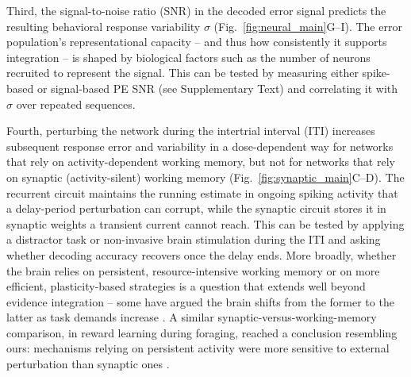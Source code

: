 \begin{ms}
Third, the signal-to-noise ratio (SNR) in the decoded error signal predicts the resulting behavioral response variability $\sigma$ (Fig.~\ref{fig:neural_main}G--I). The error population's representational capacity -- and thus how consistently it supports integration -- is shaped by biological factors such as the number of neurons recruited to represent the signal. This can be tested by measuring either spike-based or signal-based PE SNR (see Supplementary Text) and correlating it with $\sigma$ over repeated sequences.

Fourth, perturbing the network during the intertrial interval (ITI) increases subsequent response error and variability in a dose-dependent way for networks that rely on activity-dependent working memory, but not for networks that rely on synaptic (activity-silent) working memory (Fig.~\ref{fig:synaptic_main}C--D). The recurrent circuit maintains the running estimate in ongoing spiking activity that a delay-period perturbation can corrupt, while the synaptic circuit stores it in synaptic weights a transient current cannot reach. This can be tested by applying a distractor task or non-invasive brain stimulation during the ITI and asking whether decoding accuracy recovers once the delay ends. More broadly, whether the brain relies on persistent, resource-intensive working memory or on more efficient, plasticity-based strategies is a question that extends well beyond evidence integration -- some have argued the brain shifts from the former to the latter as task demands increase \citep{collins2012much, westbrook2025striatal}. A similar synaptic-versus-working-memory comparison, in reward learning during foraging, reached a conclusion resembling ours: mechanisms relying on persistent activity were more sensitive to external perturbation than synaptic ones \citep{pereira2024brain}.
\end{ms}

